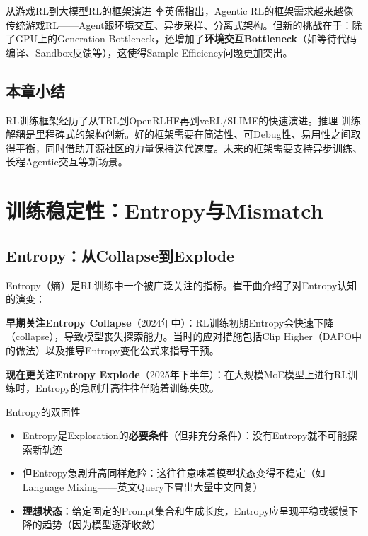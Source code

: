 \documentclass[a4paper]{article}
\begin{document}
\begin{knowledgebox}{从游戏RL到大模型RL的框架演进}
李英儒指出，Agentic RL的框架需求越来越像传统游戏RL——Agent跟环境交互、异步采样、分离式架构。但新的挑战在于：除了GPU上的Generation Bottleneck，还增加了\textbf{环境交互Bottleneck}（如等待代码编译、Sandbox反馈等），这使得Sample Efficiency问题更加突出。
\end{knowledgebox}

\subsection{本章小结}

RL训练框架经历了从TRL到OpenRLHF再到veRL/SLIME的快速演进。推理-训练解耦是里程碑式的架构创新。好的框架需要在简洁性、可Debug性、易用性之间取得平衡，同时借助开源社区的力量保持迭代速度。未来的框架需要支持异步训练、长程Agentic交互等新场景。


\section{训练稳定性：Entropy与Mismatch}

\subsection{Entropy：从Collapse到Explode}

Entropy（熵）是RL训练中一个被广泛关注的指标。崔干曲介绍了对Entropy认知的演变：

\textbf{早期关注Entropy Collapse}（2024年中）：RL训练初期Entropy会快速下降（collapse），导致模型丧失探索能力。当时的应对措施包括Clip Higher（DAPO中的做法）以及推导Entropy变化公式来指导干预。

\textbf{现在更关注Entropy Explode}（2025年下半年）：在大规模MoE模型上进行RL训练时，Entropy的急剧升高往往伴随着训练失败。

\begin{importantbox}{Entropy的双面性}
\begin{itemize}
    \item Entropy是Exploration的\textbf{必要条件}（但非充分条件）：没有Entropy就不可能探索新轨迹
    \item 但Entropy急剧升高同样危险：这往往意味着模型状态变得不稳定（如Language Mixing——英文Query下冒出大量中文回复）
    \item \textbf{理想状态}：给定固定的Prompt集合和生成长度，Entropy应呈现平稳或缓慢下降的趋势（因为模型逐渐收敛）
\end{itemize}
\end{importantbox}
\end{document}
